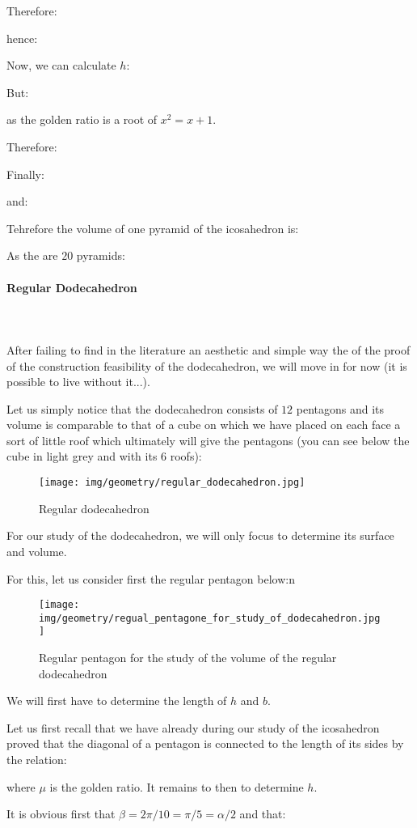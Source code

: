 {	Therefore:
	
	hence:
	
	Now, we can calculate $h$:
	
	But:
	
	as the golden ratio is a root of $x^2=x+1$.

	Therefore:
	
	Finally:
	
	and:
	
	Tehrefore the volume of one pyramid of the icosahedron is:
	
	As the are $20$ pyramids:
	
	
	\paragraph{Regular Dodecahedron}\mbox{}\\\\
	After failing to find in the literature an aesthetic and simple way the of the proof of the construction feasibility of the dodecahedron, we will move in for now (it is possible to live without it...).
	
	Let us simply notice that the dodecahedron consists of $12$ pentagons and its volume is comparable to that of a cube on which we have placed on each face a sort of little roof which ultimately will give the pentagons (you can see below the cube in light grey and with its $6$ roofs):
	\begin{figure}[H]
		\centering
		\texttt{[image: img/geometry/regular\_dodecahedron.jpg]}
		\caption{Regular dodecahedron}
	\end{figure}
	For our study of the dodecahedron, we will only focus to determine its surface and volume.
	
	For this, let us consider first the regular pentagon below:n
	\begin{figure}[H]
		\centering
		\texttt{[image: img/geometry/regual\_pentagone\_for\_study\_of\_dodecahedron.jpg]}
		\caption{Regular pentagon for the study of the volume of the regular dodecahedron}
	\end{figure}
	We will first have to determine the length of $h$ and $b$.

	Let us first recall that we have already during our study of the icosahedron proved that the diagonal of a pentagon is connected to the length of its sides by the relation:
	
	where $\mu$ is the golden ratio. It remains to  then to determine $h$.

	It is obvious first that $\beta=2\pi/10=\pi/5=\alpha/2$ and that:
	
}
